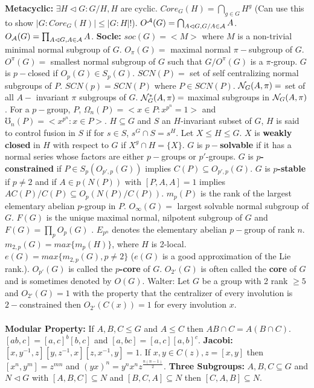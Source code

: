{\bf Metacyclic:} $\exists H \lhd G: G/H ,H$ are cyclic. 
$Core_G(H)= \bigcap_{g \in G} H^g$ (Can use this to show $|G:Core_G(H)|\le |G:H|!$).
$O^{\cal A}(G)= \bigcap_{A \lhd G, G/A \in {\cal A}} A$.
$O_{\cal A}(G)= \prod_{A \lhd G, A \in {\cal A}} A$.
{\bf Socle:} $soc(G)= <M>$ where $M$ is a non-trivial minimal normal subgroup of $G$.
$O_{\pi}(G)=$ maximal normal $\pi-$subgroup of $G$.
$O^{\pi}(G)=$ smallest normal subgroup of $G$ such that $G/O^{\pi}(G)$ is a $\pi$-group.
$G$ is $p-$closed if $O_p(G) \in S_p(G)$.
$SCN(P)=$ set of self centralizing normal subgroups of $P$.
$SCN(p)= SCN(P)$ where $P \in SCN(P)$.
${\cal N}_G(A, \pi)=$ set of all $A-$ invariant $\pi$ subgroups of $G$.
${\cal N}_G^*(A, \pi)=$  maximal subgroups in ${\cal N}_G(A, \pi)$.  For a $p-$group, $P$,
$\Omega_n(P)= <x \in P: x^{p^n}=1>$ and
$\mho_n(P)= <x^{p^n}: x \in P>$.
$H \subseteq G$ and $S$ an $H$-invariant subset of $G$, $H$ is said to control fusion
in $S$ if for $s \in S$, $s^G \cap S = s^H$.
Let $X \le H \le G$.  $X$ is {\bf weakly closed} in $H$ with respect to $G$ if
$X^g \cap H = \{X\}$.
$G$ is {\bf $p-$solvable} if it has a normal series whose factors are either
$p-$groups or $p'$-groups.  
$G$ is {\bf $p$-constrained} if 
$P \in S_p ( O_{p',p} (G))$ implies $C(P) \subseteq O_{p',p} (G)$.
$G$ is {\bf $p$-stable} if $p \ne 2$ and 
if $A \in p(N(P))$ with $[P,A,A]= 1$ implies $A C(P)/C(P) \subseteq O_p (N(P)/C(P))$.
$m_p(P)$ is the rank of the largest elementary abelian $p$-group in $P$.
$O_{\infty}(G)=$ largest solvable normal subgroup of $G$.
$F(G)$ is the unique maximal normal, nilpotent subgroup of $G$ and
$F(G)= \prod_p O_p(G)$ .
$E_{p^n}$ denotes the elementary abelian $p-$group of rank $n$.
$m_{2,p}(G) = max \{ m_p (H) \}$, where $H$ is 2-local.
$e(G) = max \{ m_{2,p} (G), p \ne 2 \}$ ($e(G)$ is a good approximation of
the Lie rank.).
$O_{p'}(G)$ is called the {\bf $p$-core} of $G$. $O_{2'}(G)$ is often called the
{\bf core} of $G$ and is sometimes denoted by $O(G)$.
Walter: Let $G$ be a group with 2 rank $\ge 5$ and $O_{2'}(G)=1$ with the property
that the centralizer of every involution is $2-$constrained then $O_{2'}(C(x))=1$ for
every involution $x$.\\
\\
{\bf Modular Property:} If $A, B, C \le G$ and $A \le C$ then $AB \cap C= A(B \cap C)$.
$[ab,c]= [a,c]^b [b,c]$ and $[a,bc]=[a,c] [a,b]^c$.  
{\bf Jacobi:} $ [x, y^{-1}, z] [y, z^{-1}, x] [z, x^{-1}, y]=1$.
If $x,y \in C(z), z=[x,y]$ then
$[x^n , y^m ]= z^{mn}$ and $(yx)^n= y^n x^n z^{\frac {n(n-1)} 2}$.  
{\bf Three Subgroups:} $A, B, C \subseteq G$ and
$N \lhd G$ with
$[A,B,C] \subseteq N$ and
$[B,C,A] \subseteq N$ then
$[C,A,B] \subseteq N$.\\
\\
